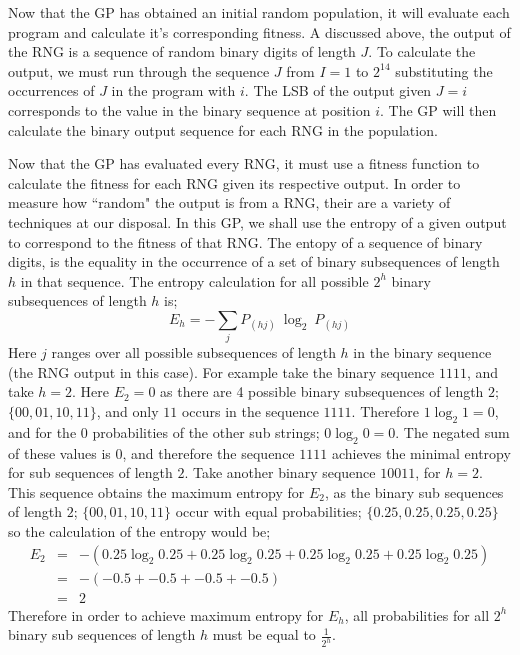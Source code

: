 \documentclass[a4paper,10.5pt]{article}
\begin{document}
Now that the GP has obtained an initial random population, it will evaluate each program and calculate it's corresponding fitness. A discussed above, the output of the RNG is a sequence of random binary digits of length $J$. To calculate the output, we must run through the sequence $J$ from $I = 1$ to $2^{14}$ substituting the occurrences of $J$ in the program with $i$. The LSB of the output given $J = i$ corresponds to the value in the binary sequence at position $i$. The GP will then calculate the binary output sequence for each RNG in the population. 

Now that the GP has evaluated every RNG, it must use a fitness function to calculate the fitness for each RNG given its respective output. In order to measure how ``random" the output is from a RNG, their are a variety of techniques at our disposal. In this GP, we shall use the entropy of a given output to correspond to the fitness of that RNG. The entopy of a sequence of binary digits, is the equality in the occurrence of a set of binary subsequences of length $h$ in that sequence. The entropy calculation for all possible $2^h$ binary subsequences of length $h$ is;
\begin{equation*}
E_{h} = - \sum_{j} P_{(hj)}\ \log_2\ P_{(hj)}
\end{equation*}
Here $j$ ranges over all possible subsequences of length $h$ in the binary sequence (the RNG output in this case). For example take the binary sequence $1111$, and take $h = 2$. Here $E_2 = 0$ as there are 4 possible binary subsequences of length $2$; $\{00, 01, 10, 11\}$, and only $11$ occurs in the sequence $1111$. Therefore $1 \log_2 1 = 0$, and for the 0 probabilities of the other sub strings; $0 \log_2 0 = 0$. The negated sum of these values is 0, and therefore the sequence $1111$ achieves the minimal entropy for sub sequences of length $2$. Take another binary sequence $10011$, for $h = 2$. This sequence obtains the maximum entropy for $E_2$, as the binary sub sequences of length $2$; $\{00, 01, 10, 11\}$ occur with equal probabilities; $\{0.25, 0.25, 0.25, 0.25\}$ so the calculation of the entropy would be; 
\begin{eqnarray*}
E_{2} &=& -(0.25 \log_2 0.25 + 0.25 \log_2 0.25 + 0.25 \log_2 0.25 + 0.25 \log_2 0.25)
\\ &=& -(-0.5 + -0.5 + -0.5 + -0.5)
\\ &=& 2
\end{eqnarray*}
Therefore in order to achieve maximum entropy for $E_h$, all probabilities for all $2^h$ binary sub sequences of length $h$ must be equal to $\frac{1}{2^h}$.
\end{document}
